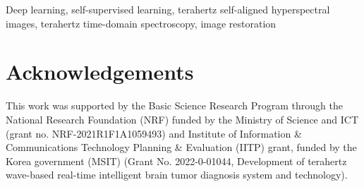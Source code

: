 \documentclass[lettersize,journal]{IEEEtran}
\begin{document}
\begin{IEEEkeywords}
Deep learning, self-supervised learning, terahertz self-aligned hyperspectral images, terahertz time-domain spectroscopy, image restoration
\end{IEEEkeywords}







\section*{Acknowledgements}
This work was supported by the Basic Science Research Program through the National Research Foundation (NRF) funded by the Ministry of Science and ICT (grant no. NRF-2021R1F1A1059493) and Institute of Information \& Communications Technology Planning \& Evaluation (IITP) grant, funded by the Korea government (MSIT) (Grant No. 2022-0-01044, Development of terahertz wave-based real-time intelligent brain tumor diagnosis system and technology).



\end{document}

